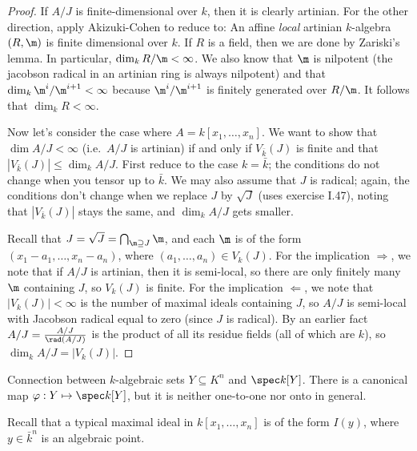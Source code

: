  \begin{proof}
   If $A/J$ is finite-dimensional over $k$, then it is clearly artinian. For the other
   direction, apply Akizuki-Cohen \anton{} to reduce to: An affine \emph{local} artinian
   $k$-algebra $(R,\m)$ is finite dimensional over $k$. If $R$ is a field, then we are
   done by Zariski's lemma. In particular, $\dim_k R/\m < \infty$. We also know that $\m$
   is nilpotent (the jacobson radical in an artinian ring is always nilpotent) and that
   $\dim_k \m^i/\m^{i+1} <\infty$ because $\m^i/\m^{i+1}$ is finitely generated over
   $R/\m$. It follows that $\dim_k R<\infty$.

   Now let's consider the case where $A=k[x_1,\dots, x_n]$. We want to show that $\dim
   A/J< \infty$ (i.e.~$A/J$ is artinian) if and only if $V_{\bar k}(J)$ is finite and
   that $|V_{\bar k}(J)|\le \dim_k A/J$. First reduce to the case $k=\bar k$; the
   conditions do not change when you tensor up to $\bar k$. We may also assume that $J$
   is radical; again, the conditions don't change when we replace $J$ by $\sqrt J$ (uses
   exercise I.47), noting that $|V_{\bar k}(J)|$ stays the same, and $\dim_k A/J$ gets
   smaller.

   Recall that $J=\sqrt J=\bigcap_{\m\supseteq J} \m$, and each $\m$ is of the form
   $(x_1-a_1,\dots, x_n-a_n)$, where $(a_1,\dots, a_n)\in V_k(J)$. For the implication
   $\Rightarrow$, we note that if $A/J$ is artinian, then it is semi-local, so there are
   only finitely many $\m$ containing $J$, so $V_k(J)$ is finite. For the implication
   $\Leftarrow$, we note that $|V_k(J)|<\infty$ is the number of maximal ideals
   containing $J$, so $A/J$ is semi-local with Jacobson radical equal to zero (since $J$
   is radical). By an earlier fact \anton{} $A/J=\frac{A/J}{\rad (A/J)}$ is the product of
   all its residue fields (all of which are $k$), so $\dim_k A/J = |V_{k}(J)|$.
 \end{proof}

 Connection between $k$-algebraic sets $Y\subseteq K^n$ and $\spec k[Y]$. There is a
 canonical map $\varphi:Y\mapsto \spec k[Y]$, but it is neither one-to-one nor onto in
 general.
 \setcounter{lecture}{22}

 Recall that a typical maximal ideal in $k[x_1,\dots, x_n]$ is of the form $I(y)$, where
 $y\in \bar k^n$ is an algebraic point.

